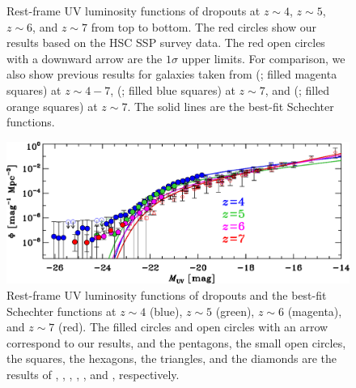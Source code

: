 \documentclass[]{pasj01}
\begin{document}
\begin{figure}
\caption{
Rest-frame UV luminosity functions of dropouts 
at $z \sim 4$, $z \sim 5$, $z \sim 6$, and $z \sim 7$ from top to bottom. 
The red circles show our results based on the HSC SSP survey data. 
The red open circles with a downward arrow are the $1\sigma$ upper limits. 
For comparison, 
we also show previous results for galaxies taken from  
 (; filled magenta squares) at $z \sim 4-7$, 
 (; filled blue squares) at $z \sim 7$, 
and 
 (; filled orange squares) at $z \sim 7$. 
The solid lines are the best-fit Schechter functions. 
}\label{fig:UVLF_selected}
\end{figure}



\begin{figure}
 \begin{center}
  \includegraphics[width=15cm]{lumi_func_all.eps} 
 \end{center}
\caption{
Rest-frame UV luminosity functions of dropouts and 
the best-fit Schechter functions 
at $z \sim 4$ (blue), $z \sim 5$ (green), $z \sim 6$ (magenta), and $z \sim 7$ (red). 
The filled circles and open circles with an arrow
correspond to our results, 
and 
the pentagons, the small open circles, 
the squares, the hexagons, the triangles, and the diamonds are 
the results of 
\citet{2013MNRAS.432.2696M}, 
\citet{2013ApJ...768..196S}, 
\citet{2015ApJ...803...34B}, 
\citet{2015ApJ...810...71F}, 
\citet{2017MNRAS.466.3612B}, 
and 
\citet{2017arXiv170204867I}, respectively. 
}\label{fig:UVLF_selected_all}
\end{figure}
\end{document}
